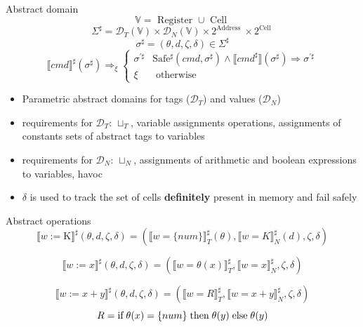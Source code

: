 \documentclass[aspectratio=169]{beamer}
\begin{document}
\begin{frame}{Abstract domain}
  $$\mathbb{V}=\text { Register } \cup \text { Cell } $$
  $$ \Sigma^{\sharp} = \mathcal{D}_T ( \mathbb{V} ) \times \mathcal{D}_N (\mathbb{V}) \times 2^{\text {Address }} \times 2^{\text {Cell }}$$
  $$\sigma^{\sharp}=(\theta, d, \zeta, \delta) \in \Sigma^{\sharp} $$
  $$ \llbracket c m d \rrbracket^{\sharp}(\sigma^{\sharp}) \Rightarrow_{\xi} \begin{cases}\sigma^{\prime \sharp} & \mathrm{Safe^{\sharp}}(c m d, \sigma^{\sharp}) \wedge\llbracket c m d^{\sharp} \rrbracket (\sigma^{\sharp}) \Rightarrow \sigma^{\prime \sharp} \\ \xi & \text { otherwise }\end{cases} $$

  \begin{itemize}
    \item Parametric abstract domains for tags ($\mathcal{D}_T$) and values ($\mathcal{D}_N$)
    \item requirements for $\mathcal{D}_T$: $\sqcup_T$, variable assignments operations, assignments of constants sets of abstract
          tags to variables
    \item requirements for $\mathcal{D}_N$: $\sqcup_N$, assignments of arithmetic and boolean expressions to variables, havoc
    \item $\delta$ is used to track the set of cells \textbf{definitely} present in memory and fail safely
  \end{itemize}
\end{frame}

\begin{frame}{Abstract operations}
  $$
    \llbracket w := \mathrm{K} \rrbracket^{\sharp}(\theta, d, \zeta, \delta)= (\llbracket w= \{num\} \rrbracket_{T}^{\sharp}(\theta),\llbracket w=K \rrbracket_{N}^{\sharp}(d),\zeta,\delta)
  $$

  $$
    \llbracket w := x \rrbracket^{\sharp}(\theta, d, \zeta, \delta)= (\llbracket w= \theta(x) \rrbracket_{T}^{\sharp},\llbracket w=x \rrbracket_{N}^{\sharp},\zeta,\delta)
  $$

  $$
    \llbracket w := x + y \rrbracket^{\sharp}(\theta, d, \zeta, \delta) = (\llbracket w=R \rrbracket^{\sharp}_{T},\llbracket w=x+y \rrbracket_{N}^{\sharp},\zeta,\delta)
  $$
  $$ R= \text{if} \thickspace \theta(x) = { \{num \}} \thickspace \text{then} \thickspace \theta(y) \thickspace \text{else} \thickspace \theta(y)$$
\end{frame}
\end{document}
